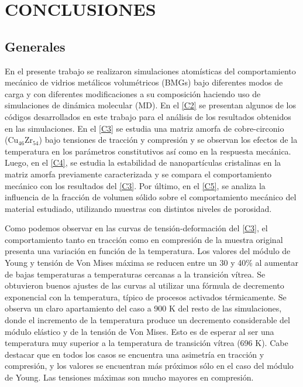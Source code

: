 
\chapter{CONCLUSIONES} %

\label{C6} %



\section{Generales}


En el presente trabajo se realizaron simulaciones atomísticas del comportamiento mecánico de vidrios metálicos volumétricos (BMGs) bajo diferentes modos de carga y con diferentes modificaciones a su composición haciendo uso de simulaciones de dinámica molecular (MD). En el \cref{C2} se presentan algunos de los códigos desarrollados en este trabajo para el análisis de los resultados obtenidos en las simulaciones. En el \cref{C3} se estudia una matriz amorfa de cobre-circonio (Cu$_{46}$Zr$_{54}$) bajo tensiones de tracción y compresión y se observan los efectos de la temperatura en los parámetros constitutivos así como en la respuesta mecánica. Luego, en el \cref{C4}, se estudia la estabilidad de nanopartículas cristalinas en la matriz amorfa previamente caracterizada y se compara el comportamiento mecánico con los resultados del \cref{C3}. Por último, en el \cref{C5}, se analiza la influencia de la fracción de volumen sólido sobre el comportamiento mecánico del material estudiado, utilizando muestras con distintos niveles de porosidad.

Como podemos observar en las curvas de tensión-deformación del \cref{C3}, el comportamiento tanto en tracción como en compresión de la muestra original presenta una variación en función de la temperatura. Los valores del módulo de Young y tensión de Von Mises máxima se reducen entre un 30 y 40\% al aumentar de bajas temperaturas a temperaturas cercanas a la transición vítrea. Se obtuvieron buenos ajustes de las curvas al utilizar una fórmula de decremento exponencial con la temperatura, típico de procesos activados térmicamente. Se observa un claro apartamiento del caso a 900 K del resto de las simulaciones, donde el incremento de la temperatura produce un decremento considerable del módulo elástico y de la tensión de Von Mises. Esto es de esperar al ser una temperatura muy superior a la temperatura de transición vítrea (696 K). Cabe destacar que en todos los casos se encuentra una asimetría en tracción y compresión, y los valores se encuentran más próximos sólo en el caso del módulo de Young. Las tensiones máximas son mucho mayores en compresión.

